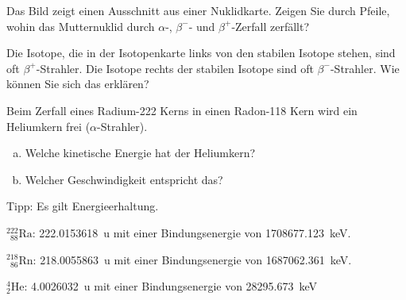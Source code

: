 \documentclass[12pt,a4paper,twoside]{article}
\newcommand{\Kern}[3]{$^{#1}_{\phantom{1}#2}\text{#3}$}
\begin{document}
\begin{aufgabe}
	Das Bild zeigt einen Ausschnitt aus einer Nuklidkarte. 
	Zeigen Sie durch Pfeile, wohin das Mutternuklid durch $\alpha$-, $\beta^{-}$- und $\beta^{+}$-Zerfall zerfällt?

	\begin{center}
		
	\end{center}

\end{aufgabe}

\begin{aufgabe}
	Die Isotope, die in der Isotopenkarte links von den stabilen Isotope stehen, sind oft $\beta^{+}$-Strahler.
	Die Isotope rechts der stabilen Isotope sind oft $\beta^{-}$-Strahler. Wie können Sie sich das erklären?
\end{aufgabe}

\begin{aufgabe}
	Beim Zerfall eines Radium-222 Kerns in einen Radon-118 Kern 
	wird ein Heliumkern frei ($\alpha$-Strahler).
	\begin{enumerate}[a)]
		\item Welche kinetische Energie hat der Heliumkern?
		\item Welcher Geschwindigkeit entspricht das?
	\end{enumerate}
	Tipp: Es gilt Energieerhaltung.

	\Kern{222}{88}{Ra}: \SI{222.0153618}{u} 
	mit einer Bindungsenergie von \SI{1708677.123}{keV}.

	\Kern{218}{86}{Rn}: \SI{218.0055863}{u}
	mit einer Bindungsenergie von \SI{1687062.361}{keV}.

	$^4_2\text{He}$: \SI{4.0026032}{u}
	mit einer Bindungsenergie von \SI{28295.673}{keV}


\end{aufgabe}

%

%
\end{document}
